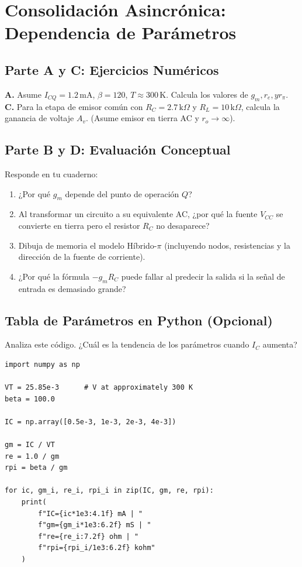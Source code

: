 \documentclass[11pt, a4paper]{article}
\begin{document}
\section*{Consolidación Asincrónica: Dependencia de Parámetros}

\subsection*{Parte A y C: Ejercicios Numéricos}
\textbf{A.} Asume $I_{CQ}=1.2\,\text{mA}$, $\beta=120$, $T \approx 300\,\text{K}$. Calcula los valores de $g_m, r_e, y r_\pi$. \\
\textbf{C.} Para la etapa de emisor común con $R_C=2.7\,\text{k}\Omega$ y $R_L=10\,\text{k}\Omega$, calcula la ganancia de voltaje $A_v$. (Asume emisor en tierra AC y $r_o \to \infty$).

\subsection*{Parte B y D: Evaluación Conceptual}
Responde en tu cuaderno:
\begin{enumerate}
    \item ¿Por qué $g_m$ depende del punto de operación $Q$?
    \item Al transformar un circuito a su equivalente AC, ¿por qué la fuente $V_{CC}$ se convierte en tierra pero el resistor $R_C$ no desaparece?
    \item Dibuja de memoria el modelo Híbrido-$\pi$ (incluyendo nodos, resistencias y la dirección de la fuente de corriente).
    \item ¿Por qué la fórmula $-g_m R_C$ puede fallar al predecir la salida si la señal de entrada es demasiado grande?
\end{enumerate}

\subsection*{Tabla de Parámetros en Python (Opcional)}
Analiza este código. ¿Cuál es la tendencia de los parámetros cuando $I_C$ aumenta?

\begin{lstlisting}
import numpy as np

VT = 25.85e-3      # V at approximately 300 K
beta = 100.0

IC = np.array([0.5e-3, 1e-3, 2e-3, 4e-3])

gm = IC / VT
re = 1.0 / gm
rpi = beta / gm

for ic, gm_i, re_i, rpi_i in zip(IC, gm, re, rpi):
    print(
        f"IC={ic*1e3:4.1f} mA | "
        f"gm={gm_i*1e3:6.2f} mS | "
        f"re={re_i:7.2f} ohm | "
        f"rpi={rpi_i/1e3:6.2f} kohm"
    )
\end{lstlisting}
\end{document}
